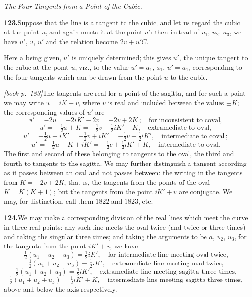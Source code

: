 \documentclass[11pt,a4paper]{article}
\begin{document}
\medskip\noindent\textit{The Four Tangents from a Point of the Cubic.}

\medskip\noindent\textbf{123.}\quad Suppose that the line is a tangent to the cubic, and let us regard the cubic at the point $u$, and again meets it at the point $u'$: then instead of $u_1$, $u_2$, $u_3$, we have $u'$, $u$, $u'$ and the relation become $2u + u'C$.

Here a being given, $u'$ is uniquely determined; this gives $u'$, the unique tangent to the cubic at the point $u$, viz., to the value $u' = a_1$, $a_1$, $u' = a_1$, corresponding to the four tangents which can be drawn from the point $u$ to the cubic.

\medskip\noindent\textit{[book p.~183]}\quad The tangents are real for a point of the sagitta, and for such a point we may write $u = iK + v$, where $v$ is real and included between the values $\pm K$; the corresponding values of $u'$ are
\[
u' = -2u = -2iK' - 2v = -2v + 2K\,;\quad\text{for inconsistent to coval},
\]
\[
u' = -\tfrac{1}{2}u + K = -\tfrac{1}{2}v - \tfrac{1}{2}iK' + K,\quad\text{extramediate to oval},
\]
\[
u' = -\tfrac{1}{2}u + iK' = -\tfrac{1}{2}v + iK' = -\tfrac{1}{2}v + \tfrac{1}{2}iK',\quad\text{intermediate to coval}\,;
\]
\[
u' = -\tfrac{1}{2}u + K + iK' = -\tfrac{1}{2}v + \tfrac{1}{2}iK' + K,\quad\text{intermediate to oval}.
\]
The first and second of these belonging to tangents to the oval, the third and fourth to tangents to the sagitta. We may further distinguish a tangent according as it passes between an oval and not passes between: the writing in the tangents from $K = -2v + 2K$, that is, the tangents from the points of the oval $K = K(K + 1)$; but the tangents from the point $iK' + v$ are conjugate. We may, for distinction, call them $1822$ and $1823$, etc.

\medskip\noindent\textbf{124.}\quad We may make a corresponding division of the real lines which meet the curve in three real points: any such line meets the oval twice (and twice or three times) and taking the singular three times; and taking the arguments to be $a$, $u_2$, $u_3$, for the tangents from the point $iK' + v$, we have
\[
\tfrac{1}{2}(u_1 + u_2 + u_3) = \tfrac{1}{2}iK',\quad\text{for intermediate line meeting oval twice,}
\]
\[
\tfrac{1}{2}(u_1 + u_2 + u_3) = \tfrac{1}{2}iK',\quad\text{extramediate line meeting oval twice,}
\]
\[
\tfrac{1}{2}(u_1 + u_2 + u_3) = \tfrac{1}{2}iK',\quad\text{extramediate line meeting sagitta three times,}
\]
\[
\tfrac{1}{2}(u_1 + u_2 + u_3) = \tfrac{1}{2}iK' + K,\quad\text{intermediate line meeting sagitta three times,}
\]
above and below the axis respectively.
\end{document}

